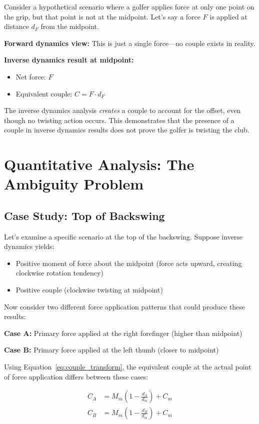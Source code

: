 \documentclass[11pt,a4paper]{article}
\begin{document}
Consider a hypothetical scenario where a golfer applies force at only one point on the grip, but that point is not at the midpoint. Let's say a force $F$ is applied at distance $d_F$ from the midpoint.

\textbf{Forward dynamics view:} This is just a single force—no couple exists in reality.

\textbf{Inverse dynamics result at midpoint:}
\begin{itemize}
    \item Net force: $F$
    \item Equivalent couple: $C = F \cdot d_F$
\end{itemize}

The inverse dynamics analysis \emph{creates} a couple to account for the offset, even though no twisting action occurs. This demonstrates that the presence of a couple in inverse dynamics results does not prove the golfer is twisting the club.

\section{Quantitative Analysis: The Ambiguity Problem}

\subsection{Case Study: Top of Backswing}

Let's examine a specific scenario at the top of the backswing. Suppose inverse dynamics yields:
\begin{itemize}
    \item Positive moment of force about the midpoint (force acts upward, creating clockwise rotation tendency)
    \item Positive couple (clockwise twisting at midpoint)
\end{itemize}

Now consider two different force application patterns that could produce these results:

\textbf{Case A:} Primary force applied at the right forefinger (higher than midpoint)

\textbf{Case B:} Primary force applied at the left thumb (closer to midpoint)

Using Equation~\ref{eq:couple_transform}, the equivalent couple at the actual point of force application differs between these cases:

\begin{align}
C_A &= M_m \left(1 - \frac{d_A}{d_m}\right) + C_m \\
C_B &= M_m \left(1 - \frac{d_B}{d_m}\right) + C_m
\end{align}
\end{document}
